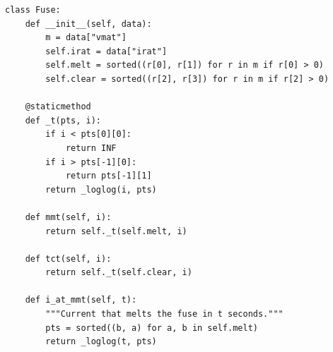 \documentclass[12pt,a4paper]{article}
\begin{document}
\begin{lstlisting}
class Fuse:
    def __init__(self, data):
        m = data["vmat"]
        self.irat = data["irat"]
        self.melt = sorted((r[0], r[1]) for r in m if r[0] > 0)
        self.clear = sorted((r[2], r[3]) for r in m if r[2] > 0)

    @staticmethod
    def _t(pts, i):
        if i < pts[0][0]:
            return INF
        if i > pts[-1][0]:
            return pts[-1][1]
        return _loglog(i, pts)

    def mmt(self, i):
        return self._t(self.melt, i)

    def tct(self, i):
        return self._t(self.clear, i)

    def i_at_mmt(self, t):
        """Current that melts the fuse in t seconds."""
        pts = sorted((b, a) for a, b in self.melt)
        return _loglog(t, pts)
\end{lstlisting}
\end{document}
